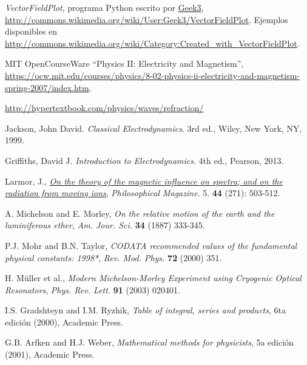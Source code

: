 \begin{thebibliography}{99}
 \textit{VectorFieldPlot}, programa Python escrito por \href{http://commons.wikimedia.org/wiki/User:Geek3}{Geek3}, \url{http://commons.wikimedia.org/wiki/User:Geek3/VectorFieldPlot}. Ejemplos disponibles en \url{http://commons.wikimedia.org/wiki/Category:Created_with_VectorFieldPlot}.


 MIT OpenCourseWare  ``Physics II: Electricity and Magnetism'', \url{https://ocw.mit.edu/courses/physics/8-02-physics-ii-electricity-and-magnetism-spring-2007/index.htm}.

\url{http://hypertextbook.com/physics/waves/refraction/}

 Jackson, John David. \textit{Classical Electrodynamics}. 3rd ed., Wiley, New York, NY, 1999.

 Griffiths, David J. \textit{Introduction to Electrodynamics}. 4th ed., Pearson, 2013.

 Larmor, J., \href{doi.org/10.1080/14786449708621095}{\textit{On the theory of the magnetic influence on spectra; and on the radiation from moving ions}}, \textsl{Philosophical Magazine}. 5. \textbf{44} (271): 503-512.

 A. Michelson and E. Morley, {\it On the relative motion of the earth and the luminiferous ether}, {\sl Am. Jour. Sci.} {\bf 34} (1887) 333-345.

 P.J. Mohr and B.N. Taylor, {\it CODATA recommended values of the fundamental physical constants: 1998*}, {\sl Rev. Mod. Phys.} {\bf 72}
(2000) 351.

 H. M\"uller et al., {\it Modern Michelson-Morley
Experiment using Cryogenic Optical Resonators}, {\sl Phys. Rev. Lett.} {\bf 91} (2003) 020401.

 I.S. Gradshteyn and I.M. Ryzhik, {\it Table of integral, series and products}, 6ta edición (2000), Academic Press.

 G.B. Arfken and H.J. Weber, {\it Mathematical methods for physicists}, 5a  edición (2001), Academic Press.



\end{thebibliography}
